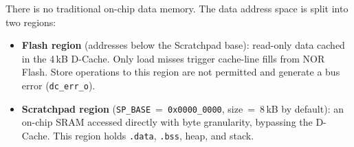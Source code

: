 There is no traditional on-chip data memory.
The data address space is split into two regions:
\begin{itemize}
  \item \textbf{Flash region} (addresses below the Scratchpad base):
    read-only data cached in the 4\,kB D-Cache.
    Only load misses trigger cache-line fills from NOR Flash.
    Store operations to this region are not permitted and generate a
    bus error (\texttt{dc\_err\_o}).
  \item \textbf{Scratchpad region}
    (\texttt{SP\_BASE}~=~\texttt{0x0000\_0000},
    size~=~8\,kB by default):
    an on-chip SRAM accessed directly with byte granularity,
    bypassing the D-Cache.
    This region holds \texttt{.data}, \texttt{.bss}, heap, and stack.
\end{itemize}
